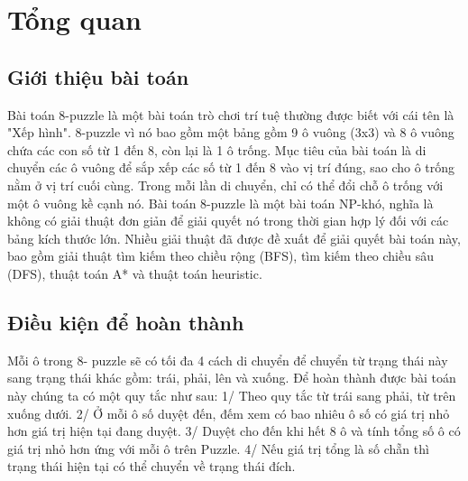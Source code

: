 
\chapter{Tổng quan}
\ifpdf
    \graphicspath{{Chapter1/Chapter1Figs/PNG/}{Chapter1/Chapter1Figs/PDF/}{Chapter1/Chapter1Figs/}}
\else
    \graphicspath{{Chapter1/Chapter1Figs/EPS/}{Chapter1/Chapter1Figs/}}
\fi

\section{Giới thiệu bài toán}

Bài toán 8-puzzle là một bài toán trò chơi trí tuệ thường được biết với cái tên là "Xếp hình".  8-puzzle vì nó bao gồm một bảng gồm 9 ô vuông (3x3) và 8 ô vuông chứa các con số từ 1 đến 8, còn lại là 1 ô trống.
Mục tiêu của bài toán là di chuyển các ô vuông để sắp xếp các số từ 1 đến 8 vào vị trí đúng, sao cho ô trống nằm ở vị trí cuối cùng. Trong mỗi lần di chuyển, chỉ có thể đổi chỗ ô trống với một ô vuông kề cạnh nó. 
Bài toán 8-puzzle là một bài toán NP-khó, nghĩa là không có giải thuật đơn giản để giải quyết nó trong thời gian hợp lý đối với các bảng kích thước lớn. Nhiều giải thuật đã được đề xuất để giải quyết bài toán này, bao gồm giải thuật tìm kiếm theo chiều rộng (BFS), tìm kiếm theo chiều sâu (DFS), thuật toán A* và thuật toán heuristic.

\section{Điều kiện để hoàn thành}
Mỗi ô trong 8- puzzle sẽ có tối đa 4 cách di chuyển để chuyển từ trạng thái này sang trạng thái khác gồm: trái, phải, lên và xuống. Để hoàn thành được bài toán này chúng ta có một quy tắc như sau:
1/ Theo quy tắc từ trái sang phải, từ trên xuống dưới.
2/ Ở mỗi ô số duyệt đến, đếm xem có bao nhiêu ô số có giá trị nhỏ hơn giá trị hiện tại đang duyệt.
3/ Duyệt cho đến khi hết 8 ô và tính tổng số ô có giá trị nhỏ hơn ứng với mỗi ô trên Puzzle.
4/ Nếu giá trị tổng là số chẵn thì trạng thái hiện tại có thể chuyển về trạng thái đích.

